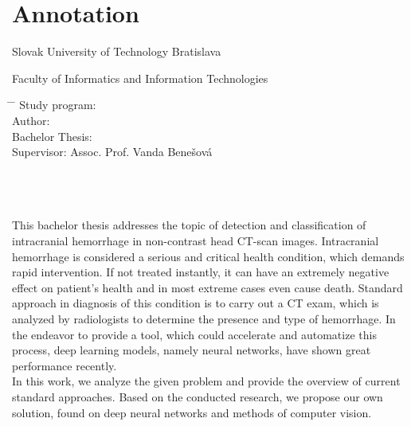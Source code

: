 
\thispagestyle{empty}




\newpage
\thispagestyle{empty}
\mbox{}
\newpage

\thispagestyle{empty}

\section*{Annotation}

\begin{minipage}[t]{1\columnwidth}%

Slovak University of Technology Bratislava 

Faculty of Informatics and Information Technologies



\begin{tabbing}
\hspace{1.5in}     \= \hspace{1in}  \= \hspace{1in}    \kill
Study program:       \> \myStudyProgramENG       \\ 
Author:     \> \myName                  \\
Bachelor Thesis: \> \tabfill{\myTitleENG}   \\
Supervisor:     \> Assoc. Prof. Vanda Benešová  
\end{tabbing}

\myDateENG
\end{minipage}
\\
\\
\\ 
This bachelor thesis addresses the topic of detection and classification of intracranial hemorrhage in non-contrast head CT-scan images. Intracranial hemorrhage is considered a serious and critical health condition, which demands rapid intervention. If not treated instantly, it can have an extremely negative effect on patient's health and in most extreme cases even cause death. Standard approach in diagnosis of this condition is to carry out a CT exam, which is analyzed by radiologists to determine the presence and type of hemorrhage. In the endeavor to provide a tool, which could accelerate and automatize this process, deep learning models, namely neural networks, have shown great performance recently.
\\
In this work, we analyze the given problem and provide the overview of current standard approaches. Based on the conducted research, we propose our own solution, found on deep neural networks and methods of computer vision.



